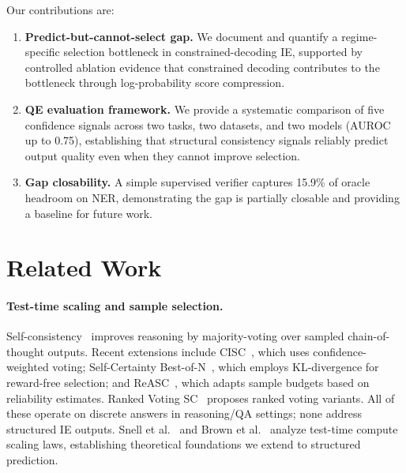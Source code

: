 \documentclass[11pt,a4paper]{article}
\begin{document}
Our contributions are:
\begin{enumerate}
\item \textbf{Predict-but-cannot-select gap.} We document and quantify a regime-specific selection bottleneck in constrained-decoding IE, supported by controlled ablation evidence that constrained decoding contributes to the bottleneck through log-probability score compression.
\item \textbf{QE evaluation framework.} We provide a systematic comparison of five confidence signals across two tasks, two datasets, and two models (AUROC up to 0.75), establishing that structural consistency signals reliably predict output quality even when they cannot improve selection.
\item \textbf{Gap closability.} A simple supervised verifier captures 15.9\% of oracle headroom on NER, demonstrating the gap is partially closable and providing a baseline for future work.
\end{enumerate}

\section{Related Work}

\paragraph{Test-time scaling and sample selection.}
Self-consistency~\cite{wang2023selfconsistency} improves reasoning by majority-voting over sampled chain-of-thought outputs. Recent extensions include CISC~\cite{cisc2025}, which uses confidence-weighted voting; Self-Certainty Best-of-N~\cite{selfcertainty2026}, which employs KL-divergence for reward-free selection; and ReASC~\cite{reasc2026}, which adapts sample budgets based on reliability estimates. Ranked Voting SC~\cite{rankedvoting2025} proposes ranked voting variants. All of these operate on discrete answers in reasoning/QA settings; none address structured IE outputs. Snell et al.~\cite{snell2024scaling} and Brown et al.~\cite{brown2024tts} analyze test-time compute scaling laws, establishing theoretical foundations we extend to structured prediction.
\end{document}
